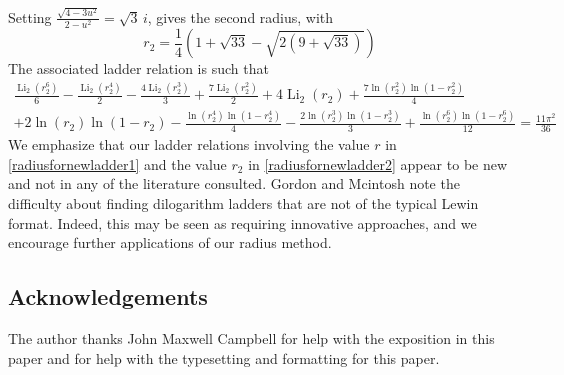 \documentclass[12pt]{article}
\begin{document}
 Setting $\frac{\sqrt{4 - 3u^2}}{2 - u^2} = \sqrt{3} \, i$, gives the second radius, with 
\begin{equation}\label{radiusfornewladder2}
 r_2 = \frac{1}{4} \left(1 + \sqrt{33} - 
 \sqrt{2 \left(9 + \sqrt{33} \right)} \right)
\end{equation}
 The associated ladder relation is such that 
\begin{multline*}
 \frac{\operatorname{Li}_2(r_2^6)}{6} - \frac{\operatorname{Li}_2(r_2^4)}{2} - \frac{4 \operatorname{Li}_2(r_2^3)}{3} + \frac{7 
 \operatorname{Li}_2(r_2^2)}{2} + 4 \operatorname{Li}_2(r_2) 
 + \frac{7 \ln(r_2^2) \ln(1 - r_2^2) }{4} \\ 
 + 2 \ln(r_2) \ln(1 - r_2) 
 - \frac{\ln(r_2^4) \ln(1 - r_2^4) }{4} - \frac{2 \ln(r_2^3) \ln(1 - r_2^3) }{3} 
 + \frac{ \ln(r_2^6) \ln(1 - r_2^6) }{12} = \frac{11\pi^2}{36} 
 \end{multline*}
 We emphasize that our ladder relations involving the value $r$ in \eqref{radiusfornewladder1} and the value $r_{2}$ in 
 \eqref{radiusfornewladder2} appear to be new and not in any of the literature consulted. Gordon and Mcintosh 
 \cite{GordonMcIntosh1997} note the difficulty about finding dilogarithm ladders that are not of the typical Lewin format. Indeed, 
 this may be seen as requiring innovative approaches, and we encourage further applications of our radius method. 
 
\subsection*{Acknowledgements}
 The author thanks John Maxwell Campbell for help with the exposition in this paper and for help with the typesetting and formatting 
 for this paper. 
\end{document}
